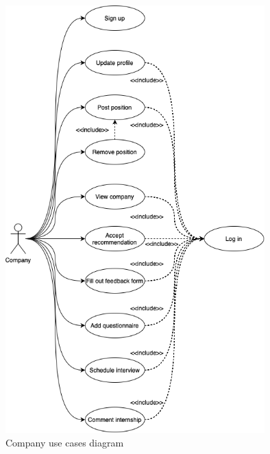 \begin{figure}[h]
   \centering    \includegraphics[width=10cm]{images/use-case-diagrams/company.png}
    \caption{Company use cases diagram}
\end{figure}

